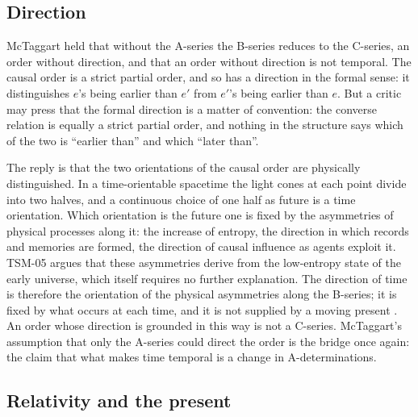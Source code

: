 \documentclass{situationist-preprint}
\begin{document}
\subsection{Direction}

McTaggart held that without the A-series the B-series reduces to the C-series, an order without direction, and that an order without direction is not temporal. The causal order is a strict partial order, and so has a direction in the formal sense: it distinguishes $e$'s being earlier than $e'$ from $e'$'s being earlier than $e$. But a critic may press that the formal direction is a matter of convention: the converse relation is equally a strict partial order, and nothing in the structure says which of the two is \enquote{earlier than} and which \enquote{later than}.

The reply is that the two orientations of the causal order are physically distinguished. In a time-orientable spacetime the light cones at each point divide into two halves, and a continuous choice of one half as future is a time orientation. Which orientation is the future one is fixed by the asymmetries of physical processes along it: the increase of entropy, the direction in which records and memories are formed, the direction of causal influence as agents exploit it. TSM-05 argues that these asymmetries derive from the low-entropy state of the early universe, which itself requires no further explanation. The direction of time is therefore the orientation of the physical asymmetries along the B-series; it is fixed by what occurs at each time, and it is not supplied by a moving present \citep{Price1996,Maudlin2007}. An order whose direction is grounded in this way is not a C-series. McTaggart's assumption that only the A-series could direct the order is the bridge once again: the claim that what makes time temporal is a change in A-determinations.

\subsection{Relativity and the present}
\end{document}
